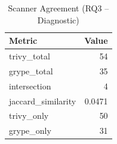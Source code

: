 \begin{table}[htbp]
\caption{Scanner Agreement (RQ3 -- Diagnostic)}
\label{tab:scanner-agreement}
\centering\small
\begin{tabular}{lr}
\toprule
\textbf{Metric} & \textbf{Value} \\
\midrule
  trivy\_total & 54 \\
  grype\_total & 35 \\
  intersection & 4 \\
  jaccard\_similarity & 0.0471 \\
  trivy\_only & 50 \\
  grype\_only & 31 \\
\bottomrule
\end{tabular}
\end{table}